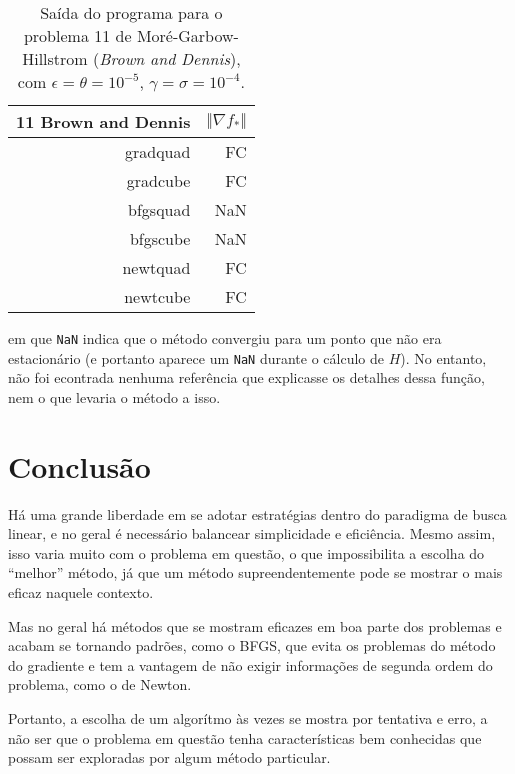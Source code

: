 \documentclass[a4paper,11pt]{article}
\begin{document}
            \begin{table}[h!]
                \centering
                \begin{tabular}{r|r}
                    11 Brown and Dennis & $\Vert\nabla f_*\Vert$ \\
                    \hline
                    gradquad&        FC \\
                    gradcube&        FC \\
                    bfgsquad&       NaN \\
                    bfgscube&       NaN \\
                    newtquad&        FC \\
                    newtcube&        FC \\
                \end{tabular}
                \caption{Saída do programa para o problema 11 de Moré-Garbow-Hillstrom (\emph{Brown and Dennis}), com $\epsilon = \theta = 10^{-5} $, $\gamma = \sigma = 10^{-4}$.}
            \end{table}
            em que \texttt{NaN} indica que o método convergiu para um ponto que não era estacionário (e portanto aparece um \texttt{NaN} durante o cálculo de $H$). No entanto, não foi econtrada nenhuma referência que explicasse os detalhes dessa função, nem o que levaria o método a isso.

    \section*{Conclusão}
        Há uma grande liberdade em se adotar estratégias dentro do paradigma de busca linear, e no geral é necessário balancear simplicidade e eficiência. Mesmo assim, isso varia muito com o problema em questão, o que impossibilita a escolha do ``melhor'' método, já que um método supreendentemente pode se mostrar o mais eficaz naquele contexto.

        Mas no geral há métodos que se mostram eficazes em boa parte dos problemas e acabam se tornando padrões, como o BFGS, que evita os problemas do método do gradiente e tem a vantagem de não exigir informações de segunda ordem do problema, como o de Newton.

        Portanto, a escolha de um algorítmo às vezes se mostra por tentativa e erro, a não ser que o problema em questão tenha características bem conhecidas que possam ser exploradas por algum método particular.
        
    
\end{document}
